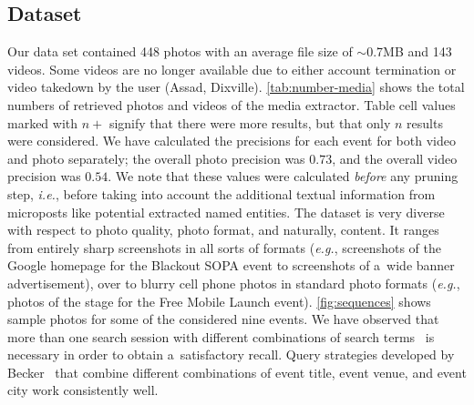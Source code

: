 \subsection{Dataset}
Our data set contained 448 photos with an average file size of
$\sim$0.7MB and 143 videos.
Some videos are no longer available due to either
account termination or video takedown by the user
(Assad, Dixville).
\autoref{tab:number-media} shows the total
numbers of retrieved photos and videos of the media extractor.
Table cell values marked with $n+$ signify that there were more
results, but that only $n$ results were considered.
We have calculated the precisions for each event for both video
and photo separately; the overall photo precision was $0.73$,
and the overall video precision was $0.54$.
We note that these values were calculated \emph{before}
any pruning step, \emph{i.e.}, before taking into account
the additional textual information from microposts like
potential extracted named entities.
The dataset is very diverse with respect to photo quality,
photo format, and naturally, content.
It ranges from entirely sharp screenshots
in all sorts of formats (\emph{e.g.},
screenshots of the Google homepage for the Blackout SOPA event
to screenshots of a~wide banner advertisement),
over to blurry cell phone photos in standard photo formats
(\emph{e.g.}, photos of the stage
for the Free Mobile Launch event).
\autoref{fig:sequences} shows sample photos for
some of the considered nine events.
We have observed that more than one search session
with different combinations of search terms~%
\cite{becker2010eventidentification,becker2012plannedevents}
is necessary in order to obtain a~satisfactory recall.
Query strategies developed by Becker~\cite{becker2012plannedevents}
that combine different combinations of event title,
event venue, and event city work consistently well.

